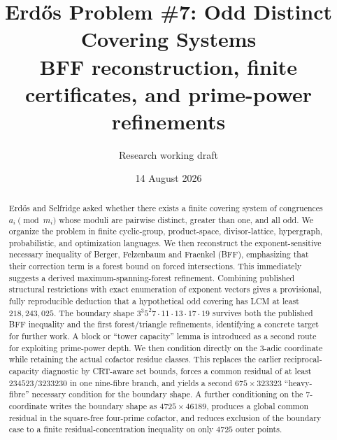 \documentclass[11pt]{article}
\title{Erd\H{o}s Problem \#7: Odd Distinct Covering Systems\\
\large BFF reconstruction, finite certificates, and prime-power refinements}
\author{Research working draft}
\date{14 August 2026}
\theoremstyle{definition}
\begin{document}
\maketitle

\begin{center}
\end{center}

\begin{abstract}
Erd\H{o}s and Selfridge asked whether there exists a finite covering system of congruences
$a_i\pmod{m_i}$ whose moduli are pairwise distinct, greater than one, and all odd.  We organize
the problem in finite cyclic-group, product-space, divisor-lattice, hypergraph, probabilistic,
and optimization languages.  We then reconstruct the exponent-sensitive necessary inequality
of Berger, Felzenbaum and Fraenkel (BFF), emphasizing that their correction term is a forest
bound on forced intersections.  This immediately suggests a derived maximum-spanning-forest
refinement.  Combining published structural restrictions with exact enumeration of exponent
vectors gives a provisional, fully reproducible deduction that a hypothetical odd covering has
LCM at least $218{,}243{,}025$.  The boundary shape
$3^3 5^2 7\cdot11\cdot13\cdot17\cdot19$ survives both the published BFF inequality and the
first forest/triangle refinements, identifying a concrete target for further work.  A block or
``tower capacity'' lemma is introduced as a second route for exploiting prime-power depth.  We
then condition directly on the $3$-adic coordinate while retaining the actual cofactor residue
classes.  This replaces the earlier reciprocal-capacity diagnostic by CRT-aware set bounds,
forces a common residual of at least $234523/3233230$ in one nine-fibre branch, and yields a
second $675\times323323$ ``heavy-fibre'' necessary condition for the boundary shape.  A further
conditioning on the $7$-coordinate writes the boundary shape as $4725\times46189$, produces a
global common residual in the square-free four-prime cofactor, and reduces exclusion of the
boundary case to a finite residual-concentration inequality on only $4725$ outer points.
\end{abstract}
\end{document}
